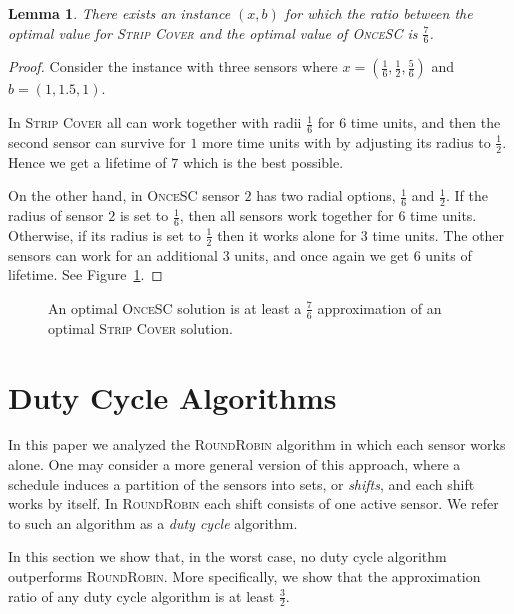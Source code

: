 \documentclass[11pt]{article}
\newtheorem{lemma}{Lemma}
\newcommand{\inv}[1]{\frac{1}{#1}}
\newcommand{\half}{\frac{1}{2}}
\newcommand{\threehalves}{\frac{3}{2}}
\newcommand{\strip}{\textsc{Strip Cover}\xspace}
\newcommand{\sosc}{\textsc{OnceSC}\xspace}
\newcommand{\rr}{\textsc{RoundRobin}\xspace}
\begin{document}
\begin{lemma}
\label{lemma:general}
There exists an instance $(x,b)$ for which the ratio between the
optimal value for \strip and the optimal value of \sosc is 
$\frac{7}{6}$.
\end{lemma}
\begin{proof}Consider the instance with three sensors where $x =
(\inv{6},\half,\frac{5}{6})$ and $b = (1,1.5,1)$.

In \strip all can work together with radii $\inv{6}$ for $6$ time
units, and then the second sensor can survive for $1$ more time units
with by adjusting its radius to $\half$.  Hence we get a lifetime of
$7$ which is the best possible.

On the other hand, in \sosc sensor $2$ has two radial options,
$\inv{6}$ and $\inv{2}$.  If the radius of sensor $2$ is set to
$\inv{6}$, then all sensors work together for $6$ time units.
Otherwise, if its radius is set to $\half$ then it works alone for $3$
time units.  The other sensors can work for an additional $3$ units,
and once again we get $6$ units of lifetime. See Figure~\ref{fig:sosc-gap}. 
\end{proof}

\begin{figure}[t]
\centering
\subfloat[$\strip(x,b) = 7$]{}
\subfloat[$\sosc(x,b) = 16/3$]{}
\caption{An optimal \sosc solution is at least a $\frac{7}{6}$ approximation of an optimal \strip solution.}
\label{fig:sosc-gap}
\end{figure}

\fi 



\section{Duty Cycle Algorithms}
\label{sec:dc}

In this paper we analyzed the \rr algorithm in which each
sensor works alone.  One may consider a more general version of this
approach, where a schedule induces a partition of the sensors into
sets, or \emph{shifts}, and each shift works by itself.  In \rr each
shift consists of one active sensor.  We refer to such an algorithm as a
\emph{duty cycle} algorithm.

In this section we show that, in the worst case, no duty cycle
algorithm outperforms \rr.  More specifically, we show that the
approximation ratio of any duty cycle algorithm is at least
$\threehalves$.
\end{document}
